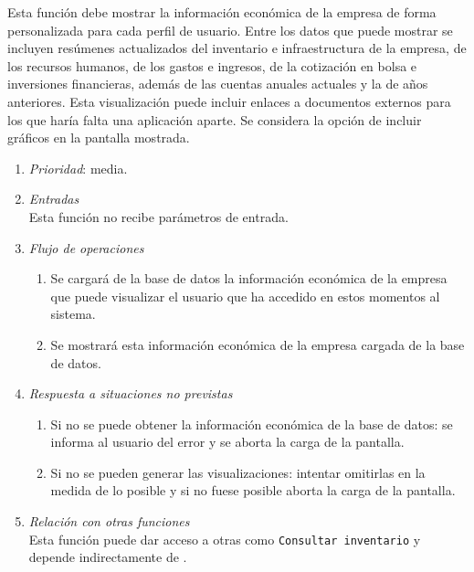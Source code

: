 	Esta función debe mostrar la información económica de la empresa de forma personalizada para cada perfil de usuario. Entre los datos que puede mostrar se incluyen resúmenes actualizados del inventario e infraestructura de la empresa, de los recursos humanos, de los gastos e ingresos, de la cotización en bolsa e inversiones financieras, además de las cuentas anuales actuales y la de años anteriores. Esta visualización puede incluir enlaces a documentos externos para los que haría falta una aplicación aparte. Se considera la opción de incluir gráficos en la pantalla mostrada.

	\begin{enumerate}
		\item \textit{Prioridad}: media.
		\item \textit{Entradas}\\
			Esta función no recibe parámetros de entrada.
			\item \textit{Flujo de operaciones}
				\begin{enumerate}
					\item Se cargará de la base de datos la información económica de la empresa que puede visualizar el usuario que ha accedido en estos momentos al sistema.
					\item Se mostrará esta información económica de la empresa cargada de la base de datos.
			\end{enumerate}
		\item \textit{Respuesta a situaciones no previstas}
			\begin{enumerate}
				\item Si no se puede obtener la información económica de la base de datos: se informa al usuario del error y se aborta la carga de la pantalla.
				\item Si no se pueden generar las visualizaciones: intentar omitirlas en la medida de lo posible y si no fuese posible aborta la carga de la pantalla.
			\end{enumerate}
		\item \textit{Relación con otras funciones}\\
			Esta función puede dar acceso a otras como \verb|Consultar inventario| y depende indirectamente de .
	\end{enumerate}
